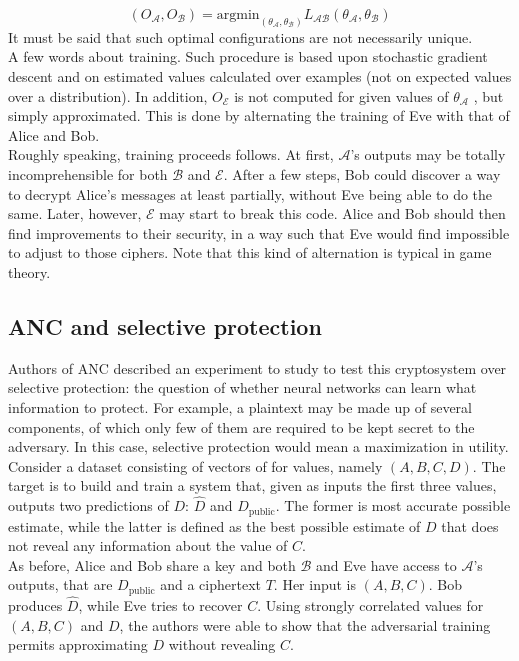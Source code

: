 \documentclass[%
    corpo=11pt,
    twoside,
    stile=classica,
    oldstyle,
    autoretitolo,
    tipotesi=magistrale,
    greek,
    evenboxes,
    english
]{toptesi}
\begin{document}
\begin{equation}
(O_{\mathcal{A}}, O_{\mathcal{B}}) = \textrm{argmin}_{(\theta_{\mathcal{A}}, \theta_{\mathcal{B}})}L_{\mathcal{A}\mathcal{B}}(\theta_{\mathcal{A}}, \theta_{\mathcal{B}}) 
\end{equation}
It must be said that such optimal configurations are not necessarily unique. \\
A few words about training. Such procedure is based upon stochastic gradient descent and on estimated values calculated over examples (not on expected values over a distribution). In addition, $O_{\mathcal{E}}$ is not computed for given values of $\theta_{\mathcal{A}}$ , but simply approximated. This is done by alternating the training of Eve with that of Alice and Bob. \\
Roughly speaking, training proceeds follows. At first, $\mathcal{A}$'s outputs may be totally incomprehensible for both $\mathcal{B}$ and $\mathcal{E}$. After a few steps, Bob could discover a way to decrypt Alice's messages at least partially, without Eve being able to do the same. Later, however, $\mathcal{E}$ may start to break this code. Alice and Bob should then find improvements to their security, in a way such that Eve would find impossible to adjust to those ciphers. Note that this kind of alternation is typical in game theory. 

\subsection{ANC and selective protection} 
Authors of ANC described an experiment to study to test this cryptosystem over selective protection: the question of whether neural networks can learn what information to protect. For example, a plaintext may be made up of several components, of which only few of them are required to be kept secret to the adversary. In this case, selective protection would mean a maximization in utility. \\
Consider a dataset consisting of vectors of for values, namely $(A, B, C, D)$. The target is to build and train a system that, given as inputs the first three values, outputs two predictions of $D$:
$\hat{D}$ and $D_{\text{public}}$. The former is most accurate possible estimate, while the latter is defined as the best possible estimate of $D$ that does not reveal any information about the value of $C$. \\
As before, Alice and Bob share a key and both $\mathcal{B}$ and Eve have access to $\mathcal{A}$'s outputs, that are $D_{\text{public}}$ and a ciphertext $T$. Her input is $(A, B, C)$. Bob produces $\hat{D}$, while Eve tries to recover $C$. 
Using strongly correlated values for $(A, B, C)$ and $D$, the authors were able to show that the adversarial training permits approximating $D$ without revealing $C$.
\end{document}
